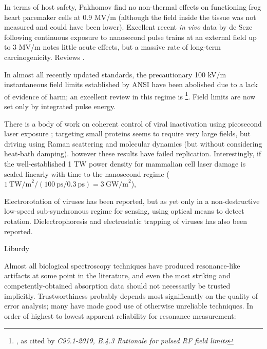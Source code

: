 \documentclass[paper.tex]{subfiles}
\begin{document}
In terms of host safety, Pakhomov \cite{Comparative} find no non-thermal effects on functioning frog heart pacemaker cells at 0.9 MV/m (although the field inside the tissue was not measured and could have been lower). Excellent recent \textit{in vivo} data by de Seze following continuous exposure to nanosecond pulse trains at an external field up to 3 MV/m \cite{Repeated2020} notes little acute effects, but a massive rate of long-term carcinogenicity. Reviews \cite{Penetration2016c} \cite{Effects2016}.

In almost all recently updated standards, the precautionary 100 kV/m instantaneous field limits established by ANSI have been abolished due to a lack of evidence of harm; an excellent review in this regime is \footnote{\cite{treatyelectromagnetic}, as cited by \textit{C95.1-2019, B.4.3 Rationale for pulsed RF field limits}}. Field limits are now set only by integrated pulse energy.



There is a body of work on coherent control of viral inactivation using picosecond laser exposure \cite{Maximum2010}; targeting small proteins seems to require very large fields\cite{Picosecond2016b}, but driving using Raman scattering \cite{Inactivation2007} \cite{Prospects2012}\cite{Studies2014} and molecular dynamics \cite{Maximum2010} (but without considering heat-bath damping). however these results have failed replication\cite{No2011}. Interestingly, if the well-established 1 TW power density\cite{Targeted2002} for mammalian cell laser damage is scaled linearly with time to the nanosecond regime ($1\ \text{TW/m}^2 / (100\ \text{ps} / 0.3\ \text{ps}) = 3\ \text{GW/m}^2$), 

Electrorotation\cite{Electrorotation1988}\cite{Electrorotation1997} of viruses has been reported\cite{Analysis2004}\cite{New1999}\cite{comprehensive2001}, but as yet only in a non-destructive low-speed sub-synchronous regime for sensing, using optical means to detect rotation. Dielectrophoresis and electrostatic trapping of viruses has also been reported.



Liburdy

Almost all biological spectroscopy techniques have produced resonance-like artifacts at some point in the literature, and even the most striking and competently-obtained absorption data should not necessarily be trusted implicitly. Trustworthiness probably depends most significantly on the quality of error analysis; many have made good use of otherwise unreliable techniques. In order of highest to lowest apparent reliability for resonance measurement:
\end{document}
